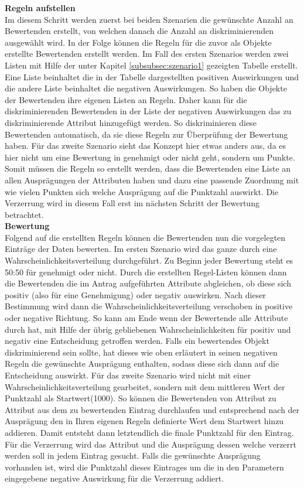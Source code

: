 \begin{onehalfspace}
\textbf{Regeln aufstellen}\\
Im diesem Schritt werden zuerst bei beiden Szenarien die gewünschte Anzahl an Bewertenden erstellt, von welchen danach die Anzahl an diskriminierenden ausgewählt wird. In der Folge können die Regeln für die zuvor als Objekte erstellte Bewertenden erstellt werden. Im Fall des ersten Szenarios werden zwei Listen mit Hilfe der unter Kapitel \ref{subsubsec:szenario1} gezeigten Tabelle erstellt. Eine Liste beinhaltet die in der Tabelle dargestellten positiven Auswirkungen und die andere Liste beinhaltet die negativen Auswirkungen. So haben die Objekte der Bewertenden ihre eigenen Listen an Regeln. Daher kann für die diskriminierenden Bewertenden in der Liste der negativen Auswirkungen das zu diskriminierende Attribut hinzugefügt werden. So diskriminieren diese Bewertenden automatisch, da sie diese Regeln zur Überprüfung der Bewertung haben. Für das zweite Szenario sieht das Konzept hier etwas anders aus, da es hier nicht um eine Bewertung in genehmigt oder nicht geht, sondern um Punkte. Somit müssen die Regeln so erstellt werden, dass die Bewertenden eine Liste an allen Ausprägungen der Attributen haben und dazu eine passende Zuordnung mit wie vielen Punkten sich welche Ausprägung auf die Punktzahl auswirkt. Die Verzerrung wird in diesem Fall erst im nächsten Schritt der Bewertung betrachtet.\\
\textbf{Bewertung}\\
Folgend auf die erstellten Regeln können die Bewertenden nun die vorgelegten Einträge der Daten bewerten. Im ersten Szenario wird das ganze durch eine Wahrscheinlichkeitsverteilung durchgeführt. Zu Beginn jeder Bewertung steht es 50:50 für genehmigt oder nicht. Durch die erstellten Regel-Listen können dann die Bewertenden die im Antrag aufgeführten Attribute abgleichen, ob diese sich positiv (also für eine Genehmigung) oder negativ auswirken. Nach dieser Bestimmung wird dann die Wahrscheinlichkeitsverteilung verschoben in positive oder negative Richtung. So kann am Ende wenn der Bewertende alle Attribute durch hat, mit Hilfe der übrig gebliebenen Wahrscheinlichkeiten für positiv und negativ eine Entscheidung getroffen werden. Falls ein bewertendes Objekt diskriminierend sein sollte, hat dieses wie oben erläutert in seinen negativen Regeln die gewünschte Ausprägung enthalten, sodass diese sich dann auf die Entscheidung auswirkt. Für das zweite Szenario wird nicht mit einer Wahrscheinlichkeitsverteilung gearbeitet, sondern mit dem mittleren Wert der Punktzahl als Startwert(1000). So können die Bewertenden von Attribut zu Attribut aus dem zu bewertenden Eintrag durchlaufen und entsprechend nach der Ausprägung den in Ihren eigenen Regeln definierte Wert dem Startwert hinzu addieren. Damit entsteht dann letztendlich die finale Punktzahl für den Eintrag. Für die Verzerrung wird das Attribut und die Ausprägung dessen welche verzerrt werden soll in jedem Eintrag gesucht. Falls die gewünschte Ausprägung vorhanden ist, wird die Punktzahl dieses Eintrages um die in den Parametern eingegebene negative Auswirkung für die Verzerrung addiert.\\

\end{onehalfspace}

